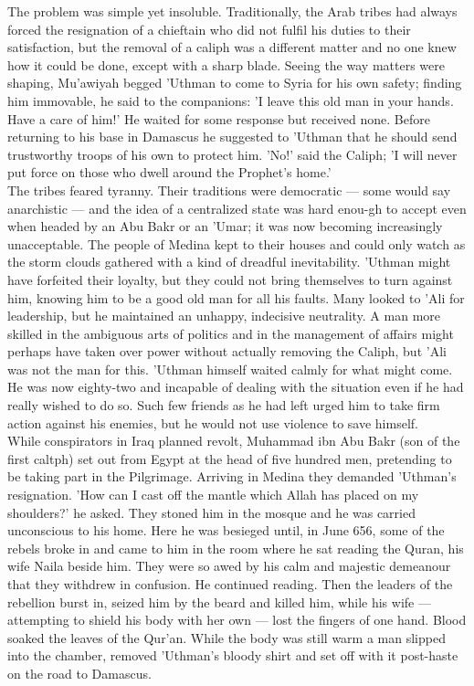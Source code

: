 \documentclass[11pt, b5paper, twoside]{book}
\begin{document}
The problem was simple yet insoluble. Traditionally, the Arab tribes had always forced the resignation of a chieftain who did not fulfil his duties to their satisfaction, but the removal of a caliph was a different matter and no one knew how it could be done, except with a sharp blade. Seeing the way matters were shaping, Mu'awiyah begged 'Uthman to come to Syria for his own safety; finding him immovable, he said to the companions: 'I leave this old man in your hands. Have a care of him!' He waited for some response but received none. Before returning to his base in Damascus he suggested to 'Uthman that he should send trustworthy troops of his own to protect him. 'No!' said the Caliph; 'I will never put force on those who dwell around the Prophet's home.' \\

The tribes feared tyranny. Their traditions were democratic --- some would say anarchistic --- and the idea of a centralized state was hard enou\hyp{}gh to accept even when headed by an Abu Bakr or an 'Umar; it was now becoming increasingly unacceptable. The people of Medina kept to their houses and could only watch as the storm clouds gathered with a kind of dreadful inevitability. 'Uthman might have forfeited their loyalty, but they could not bring themselves to turn against him, knowing him to be a good old man for all his faults. Many looked to 'Ali for leadership, but he maintained an unhappy, indecisive neutrality. A man more skilled in the ambiguous arts of politics and in the management of affairs might perhaps have taken over power without actually removing the Caliph, but 'Ali was not the man for this. 'Uthman himself waited calmly for what might come. He was now eighty-two and incapable of dealing with the situation even if he had really wished to do so. Such few friends as he had left urged him to take firm action against his enemies, but he would not use violence to save himself. \\

While conspirators in Iraq planned revolt, Muhammad ibn Abu Bakr (son of the first caltph) set out from Egypt at the head of five hundred men, pretending to be taking part in the Pilgrimage. Arriving in Medina they demanded 'Uthman's resignation. 'How can I cast off the mantle which Allah has placed on my shoulders?' he asked. They stoned him in the mosque and he was carried unconscious to his home. Here he was besieged until, in June 656, some of the rebels broke in and came to him in the room where he sat reading the Quran, his wife Naila beside him. They were so awed by his calm and majestic demeanour that they withdrew in confusion. He continued reading. Then the leaders of the rebellion burst in, seized him by the beard and killed him, while his wife --- attempting to shield his body with her own --- lost the fingers of one hand. Blood soaked the leaves of the Qur'an. While the body was still warm a man slipped into the chamber, removed 'Uthman's bloody shirt and set off with it post-haste on the road to Damascus. \\
\end{document}
